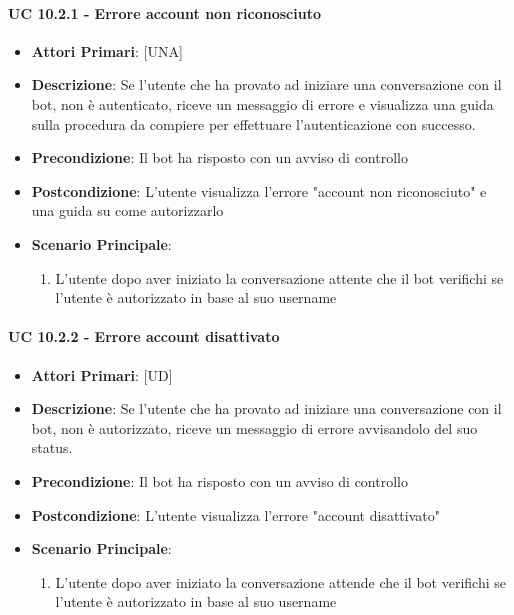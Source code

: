 			\paragraph{UC 10.2.1 - Errore account non riconosciuto}
			\begin{itemize}
				\item \textbf{Attori Primari}: [UNA] 
				\item \textbf{Descrizione}: Se l'utente che ha provato ad iniziare una conversazione con il bot, non è autenticato, riceve un messaggio di errore e visualizza una guida sulla procedura da compiere per effettuare l'autenticazione con successo.
				\item \textbf{Precondizione}: Il bot ha risposto con un avviso di controllo
				\item \textbf{Postcondizione}: L'utente visualizza l'errore "account non riconosciuto" e una guida su come autorizzarlo
				\item \textbf{Scenario Principale}:
				\begin{enumerate}
					\item{L'utente dopo aver iniziato la conversazione attente che il bot verifichi se l'utente è autorizzato in base al suo username}
				\end{enumerate}	
			\end{itemize}

			\paragraph{UC 10.2.2 - Errore account disattivato}
			\begin{itemize}
				\item \textbf{Attori Primari}: [UD]
				\item \textbf{Descrizione}: Se l'utente che ha provato ad iniziare una conversazione con il bot, non è autorizzato, riceve un messaggio di errore avvisandolo del suo status.
				\item \textbf{Precondizione}: Il bot ha risposto con un avviso di controllo 
				\item \textbf{Postcondizione}: L'utente visualizza l'errore "account disattivato"
				\item \textbf{Scenario Principale}:
				\begin{enumerate}
					\item{L'utente dopo aver iniziato la conversazione attende che il bot verifichi se l'utente è autorizzato in base al suo username}
				\end{enumerate}	
			\end{itemize}

